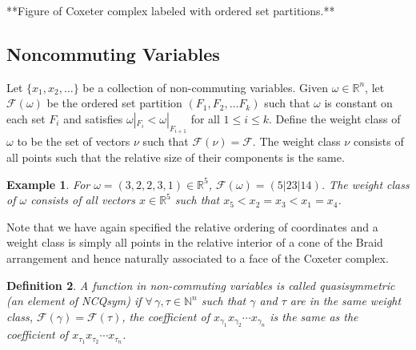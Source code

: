 \documentclass[12pt]{amsart}
\newtheorem{definition}{Definition}
\newtheorem{example}[definition]{Example}
\begin{document}
**Figure of Coxeter complex labeled with ordered set partitions.**

\subsection{Noncommuting Variables}




Let $\{x_1, x_2, \ldots \}$ be a collection of non-commuting
variables.  Given $\omega\in \mathbb{R}^n$, let $\mathcal{F}(\omega)$
be the ordered set partition $(F_1,F_2, \ldots F_k)$ such that 
$\omega$ is constant on each set $F_i$
and satisfies $\omega|_{F_i} < \omega|_{F_{i+1}}$ for all $1 \leq i \leq k$. 
Define the weight class of $\omega$ to be the set of vectors $\nu$
such that $\mathcal{F}(\nu) = \mathcal{F}$.  The weight class $\nu$ consists of all 
points such that the relative size of their components is the same.

\begin{example}
For $\omega = (3,2,2,3,1) \in \mathbb{R}^5$, $\mathcal{F}(\omega) =
(5|23|14)$.  The weight class of $\omega$ consists of all vectors $x
\in \mathbb{R}^5$ such that $x_5 < x_2 = x_3 < x_1 = x_4$. 
\end{example}

Note that
we have again specified the relative ordering of coordinates and a
weight class is simply all points in the relative interior of a cone
of the Braid arrangement and hence naturally associated to a face of
the Coxeter complex.


\begin{definition}
A function in non-commuting variables is called quasisymmetric (an element of NCQsym) if
$\forall \, \gamma, \tau \in \mathbb{N}^n$ such that $\gamma$ and $\tau$
are in the same weight class, $\mathcal{F}(\gamma) =
\mathcal{F}(\tau)$, the coefficient of $x_{\gamma_1}x_{\gamma_2} \cdots
x_{\gamma_n}$ is the same as the coefficient of $x_{\tau_1}x_{\tau_2} \cdots x_{\tau_n}$.
\end{definition}
\end{document}
